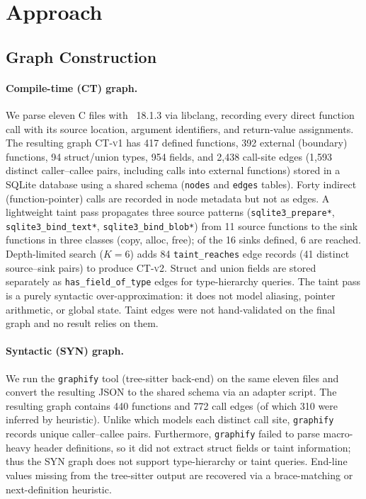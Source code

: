 \section{Approach}
\label{sec:approach}

\subsection{Graph Construction}

\paragraph{Compile-time (CT) graph.}
We parse eleven \sqlite{} C files with \clang~18.1.3 via libclang, recording
every direct function call with its source location, argument identifiers, and
return-value assignments.
The resulting graph \textsc{CT-v1} has 417 defined functions, 392 external (boundary) functions,
94 struct/union types, 954 fields, and 2{,}438 call-site edges (1{,}593 distinct caller--callee pairs, including calls into external functions) stored in a SQLite database using
a shared schema (\texttt{nodes} and \texttt{edges} tables).
Forty indirect (function-pointer) calls are recorded in node metadata but not as edges.
A lightweight taint pass propagates three source patterns
(\texttt{sqlite3\_prepare*}, \texttt{sqlite3\_bind\_text*}, \texttt{sqlite3\_bind\_blob*}) from 11 source functions
to the sink functions in three classes (copy, alloc, free); of the 16 sinks defined, 6 are reached.
Depth-limited search ($K=6$) adds 84 \texttt{taint\_reaches} edge records (41 distinct source--sink pairs) to produce \textsc{CT-v2}.
Struct and union fields are stored separately as \texttt{has\_field\_of\_type} edges for type-hierarchy queries.
The taint pass is a purely syntactic over-approximation: it does not model aliasing, pointer arithmetic, or global state.
Taint edges were not hand-validated on the final graph and no result relies on them.

\paragraph{Syntactic (SYN) graph.}
We run the \texttt{graphify} tool (tree-sitter back-end) on the same eleven
files and convert the resulting JSON to the shared schema via an adapter script.
The resulting graph contains 440 functions and 772 call edges (of which 310 were
inferred by heuristic).
Unlike \clang which models each distinct call site, \texttt{graphify} records unique
caller--callee pairs.
Furthermore, \texttt{graphify} failed to parse macro-heavy header definitions,
so it did not extract struct fields or taint information; thus the SYN graph
does not support type-hierarchy or taint queries.
End-line values missing from the tree-sitter output are recovered via a
brace-matching or next-definition heuristic.

